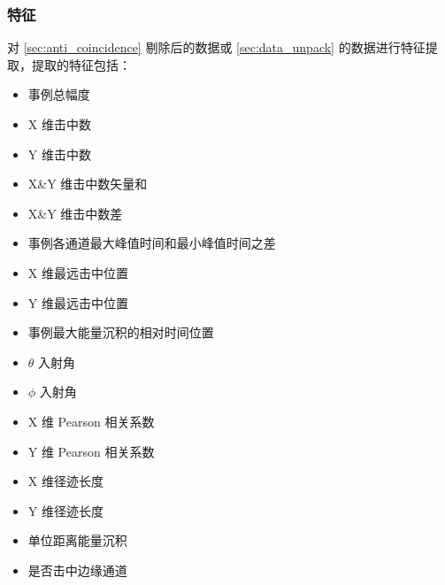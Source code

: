 \subsubsection{特征}
对 \ref{sec:anti_coincidence} 剔除后的数据或 \ref{sec:data_unpack} 的数据进行特征提取，提取的特征包括：
\begin{itemize}
    \item 事例总幅度
    \item X 维击中数
    \item Y 维击中数
    \item X\&Y 维击中数矢量和
    \item X\&Y 维击中数差
    \item 事例各通道最大峰值时间和最小峰值时间之差
    \item X 维最远击中位置
    \item Y 维最远击中位置
    \item 事例最大能量沉积的相对时间位置
    \item $\theta$ 入射角
    \item $\phi$ 入射角
    \item X 维 Pearson 相关系数
    \item Y 维 Pearson 相关系数
    \item X 维径迹长度
    \item Y 维径迹长度
    \item 单位距离能量沉积
    \item 是否击中边缘通道
\end{itemize}

